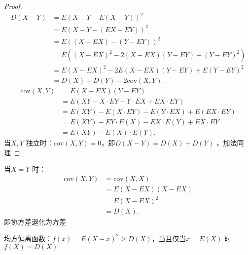 \begin{proof}
    \begin{align*}
        D\left( X-Y \right) &=E\left( X-Y-E\left( X-Y \right)  \right) ^2\\
        &= E\left( X-Y-\left( EX-EY \right)  \right) ^2 \\
        &= E\left( \left( X-EX \right) -\left( Y-EY \right)  \right) ^2 \\
        &= E\left( \left( X-EX \right) ^2-2\left( X-EX \right) \left( Y-EY \right) +\left( Y-EY \right) ^2 \right)  \\
        &= E\left( X-EX \right) ^2 -2E\left( X-EX \right) \left( Y-EY \right) +E\left( Y-EY \right) ^2\\
        &= D\left( X \right) +D\left( Y \right) -2\text{cov}\left( X,Y \right)
    .\end{align*}
    \begin{align*}
        \text{cov}\left( X,Y \right) &= E\left( X-EX \right) \left( Y-EY \right)\\
        &= E\left( XY-X\cdot EY-Y\cdot EX+EX\cdot EY \right) \\
        &= E\left( XY \right) -E\left( X\cdot EY \right) -E\left( Y\cdot EX \right) +E\left( EX\cdot EY \right)  \\
        &= E\left( XY \right) -EY\cdot E\left( X \right) -EX\cdot E\left( Y \right)+EX\cdot EY  \\
        &= E\left( XY \right) -E\left( X \right) \cdot E\left( Y \right)
    .\end{align*}
    当$X,Y$ 独立时：$\text{cov}\left( X,Y \right) =0$，即$D\left( X-Y \right) =D\left( X \right) +D\left( Y \right) $ ，加法同理
\end{proof}
\begin{notation}
    当$X=Y$ 时：
    \begin{align*}
        \text{cov}\left( X,Y \right) &= \text{cov}\left( X,X \right) \\
        &= E\left( X-EX \right) \left( X-EX \right)  \\
        &= E\left( X-EX \right) ^2 \\
        &= D\left( X \right)
    .\end{align*}
    即协方差退化为方差
\end{notation}
\begin{notation}
    均方偏离函数：$f\left( x \right) =E\left( X-x \right) ^2\ge D\left( X \right) $，当且仅当$x=E\left( X \right) $ 时$f\left( X \right) =D\left( X \right) $
\end{notation}
